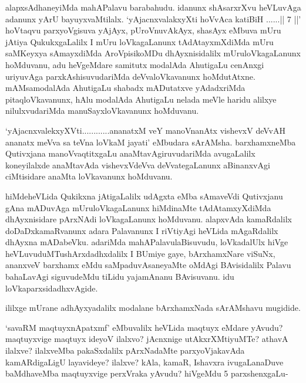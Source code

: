 \begin{artha}
alapxsAdhaneyiMda mahAPalavu barabahudu. idanunx shAsarxrXvu heVLuvAga adanunx yArU bayuyxvaMtilalx. `yAjacnxvalakxyXti hoVvAca katiBiH ......|| 7 ||' hoVtaqvu parxyoVgisuva yAjAyx, pUroVnuvAkAyx, shasAyx eMbuva mUru jAtiya QukukxgaLalilx I mUru loVkagaLanunx tAdAtayxmXdiMda  mUru saMKeyxya sAmayxdiMda AroVpisikoMDu dhAyxnisidalilx mUruloVkagaLanunx hoMduvanu, adu heVgeMdare samitutx modalAda AhutigaLu cenAnxgi uriyuvAga parxkAshisuvudariMda deVvaloVkavanunx hoMdutAtxne. mAMsamodalAda AhutigaLu shabadx mADutatxve yAdadxriMda pitaqloVkavanunx, hAlu modalAda AhutigaLu nelada meVle haridu alilxye nilulxvudariMda manuSayxloVkavanunx hoMduvanu.

`yAjacnxvalekxyXVti............ananatxM veY manoV\s nanAtx vishevxV deVvAH ananatx meVva sa teVna loVkaM jayati' eMbudara sArAMsha. barxhamxneMba Qutivxjana manoVvaqtitxgaLu 
anaMtavAgiruvudariMda avugaLalilx koneyilalxde anaMtavAda vishevxVdeVva deVvategaLanunx 
aBinanxvAgi ciMtisidare anaMta loVkavanunx hoMduvanu.
\end{artha}

\centerline{}

\begin{artha}
hiMdeheVLida  Qukikxna jAtigaLalilx udAgxta eMba sAmaveVdi Qutivxjanu  gAna mADuvAga mUruloVkagaLanunx hiMdinaMte tAdAtamxyXdiMda dhAyxnisidare pArxNAdi loVkagaLanunx hoMduvanu. alapxvAda kamaRdalilx doDaDxkamaRvanunx adara Palavanunx I riVtiyAgi heVLida mAgaRdalilx dhAyxna mADabeVku. adariMda mahAPalavulaBisuvudu, loVkadalUlx hiVge heVLuvuduMTu\ndash  shArxdadhxdalilx I BUmiye gaye, bArxhamxNare viSuNx, ananxveV barxhamx eMdu saMpaduvAsaneyaMte oMdAgi BAvisidalilx Palavu bahaLavAgi siguvudeMdu tiLidu yajamAnanu BAvisuvanu. idu loVkaparxsidadhxvAgide.
\end{artha}

\begin{artha}ililxge mUrane adhAyxyadalilx modalane bArxhamxNada sArAMshavu mugidide.\end{artha}


\begin{artha}
`savaRM maqtuyxnA\s \s patxmf' eMbuvalilx heVLida maqtuyx eMdare yAvudu? maqtuyxvige maqtuyx ideyoV ilalxvo? jAcnxnige  utAkxrXMtiyuMTe? athavA ilalxve? ilalxveMba pakaSxdalilx pArxNadaMte parxyoVjakavAda kamARdigaLigU layavideye? ilalxve?  kAla, kamaR, Ishavxra ivugaLanaDuve baMdhaveMba maqtuyxvige perxVraka yAvudu? hiVgeMdu 5 parxshenxgaLu-
\end{artha}

